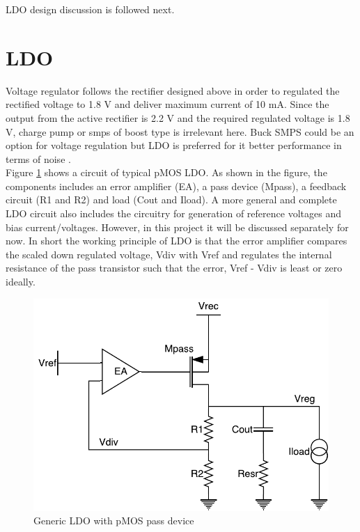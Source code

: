 \documentclass[12pt,a4paper,UKenglish]{article}
\begin{document}
LDO design discussion is followed next.

\newpage

\section{LDO}

Voltage regulator follows the rectifier designed above in order to regulated the rectified voltage to 1.8 V and deliver maximum current of 10 mA. Since the output from the active rectifier is 2.2 V and the required regulated voltage is 1.8 V, charge pump or  \acrshort{smps} of boost type is irrelevant here. Buck SMPS could be an option for voltage regulation but LDO is preferred for it better performance in terms of noise \cite{ldo_psu}.\\ 

Figure \ref{ldo_gen} shows a circuit of typical pMOS LDO. As shown in the figure, the components includes an error amplifier (EA), a pass device (Mpass), a feedback circuit (R1 and R2) and load (Cout and Iload). A more general and complete LDO circuit also includes the circuitry for generation of reference voltages and bias current/voltages. However, in this project it will be discussed separately for now. In short the working principle of LDO is that the error amplifier compares the scaled down regulated voltage, Vdiv with Vref and regulates the internal resistance of the pass transistor such that  the error, Vref - Vdiv is least or zero ideally. 

\begin{figure}[htbp] %
   \centering
   \includegraphics[width=.8\textwidth]{img/ldo.pdf} 
   \caption{Generic LDO with pMOS pass device}
   \label{ldo_gen}
\end{figure}
\end{document}
